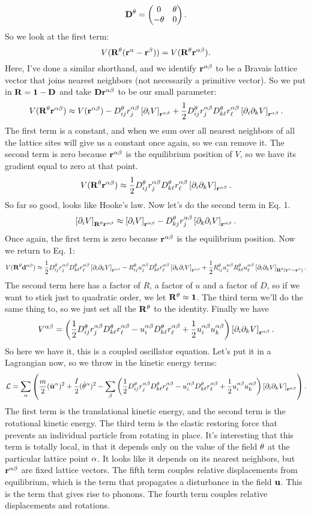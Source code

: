 \documentclass[12pt]{article}
\begin{document}
\[ \mathbf{D}^\theta = \left(\begin{matrix}0 & \theta \\ -\theta & 0\end{matrix}\right).\]
So we look at the first term:
\[ V(\mathbf{R}^\theta (\mathbf{r}^\alpha - \mathbf{r}^\beta)) = V(\mathbf{R}^\theta \mathbf{r}^{\alpha\beta}).\]
Here, I've done a similar shorthand, and we identify $\mathbf{r}^{\alpha\beta}$ to be a Bravais lattice vector that joins nearest neighbors (not necessarily a primitive vector). So we put in $\mathbf{R} = \mathbf{1} - \mathbf{D}$ and take $\mathbf{D} \mathbf{r}^{\alpha\beta}$ to be our small parameter:
\[ V(\mathbf{R}^\theta \mathbf{r}^{\alpha\beta}) \approx V(\mathbf{r}^{\alpha\beta}) - D^\theta_{ij}r^{\alpha\beta}_j \left [ \partial_i V \right ]_{\mathbf{r}^{\alpha\beta}} + \frac{1}{2} D^\theta_{ij}r^{\alpha\beta}_j D^\theta_{k\ell} r^{\alpha\beta}_\ell \left [ \partial_i\partial_k V \right ]_{\mathbf{r}^{\alpha\beta}}.\]
The first term is a constant, and when we sum over all nearest neighbors of all the lattice sites will give us a constant once again, so we can remove it. The second term is zero because $\mathbf{r}^{\alpha\beta}$ is the equilibrium position of $V$, so we have its gradient equal to zero at that point.
\[ V(\mathbf{R}^\theta \mathbf{r}^{\alpha\beta}) \approx \frac{1}{2} D^\theta_{ij}r^{\alpha\beta}_j D^\theta_{k\ell} r^{\alpha\beta}_\ell \left [ \partial_i\partial_k V \right ]_{\mathbf{r}^{\alpha\beta}}.\]
So far so good, looks like Hooke's law. Now let's do the second term in Eq. 1.
\[ \left [ \partial_i V \right ]_{\mathbf{R}^\theta \mathbf{r}^{\alpha\beta}} \approx \left [ \partial_i V \right ]_{\mathbf{r}^{\alpha\beta}} - D^\theta_{k j}r^{\alpha\beta}_j \left [ \partial_k \partial_i V \right ]_{\mathbf{r}^{\alpha\beta}}.\]
Once again, the first term is zero because $\mathbf{r}^{\alpha\beta}$ is the equilibrium position. Now we return to Eq. 1:
\[ V(\mathbf{R}^\theta \mathbf{d}^{\alpha\beta}) \approx \frac{1}{2} D^\theta_{ij}r^{\alpha\beta}_j D^\theta_{k\ell} r^{\alpha\beta}_\ell \left [ \partial_i\partial_k V \right ]_{\mathbf{r}^{\alpha\beta}} -R^\theta_{ij} u^{\alpha\beta}_j D^\theta_{k\ell}r^{\alpha\beta}_\ell \left [ \partial_k \partial_i V \right ]_{\mathbf{r}^{\alpha\beta}} + \frac{1}{2} R^\theta_{ij}u^{\alpha\beta}_jR^\theta_{k \ell}u^{\alpha\beta}_\ell \left [ \partial_i \partial_k V \right ]_{\mathbf{R}^\theta (\mathbf{r}^\alpha - \mathbf{r}^\beta)}.\]
The second term here has a factor of $R$, a factor of $u$ and a factor of $D$, so if we want to stick just to quadratic order, we let $\mathbf{R}^\theta \approx \mathbf{1}$. The third term we'll do the same thing to, so we just set all the $\mathbf{R}^\theta$ to the identity. Finally we have
\[ V^{\alpha\beta} = \left( \frac{1}{2} D^\theta_{ij}r^{\alpha\beta}_j D^\theta_{k\ell} r^{\alpha\beta}_\ell - u^{\alpha\beta}_i D^\theta_{k\ell}r^{\alpha\beta}_\ell  +\frac{1}{2}u^{\alpha\beta}_i u^{\alpha\beta}_k       \right) \left [ \partial_i\partial_k V \right ]_{\mathbf{r}^{\alpha\beta}}.\]
So here we have it, this is a coupled oscillator equation. Let's put it in a Lagrangian now, so we throw in the kinetic energy terms:
\[ \mathcal{L} = \sum_\alpha\left( \frac{m}{2}(\dot{\mathbf{u}}^\alpha)^2    + \frac{I}{2}(\dot{\theta}^\alpha)^2 - \sum_\beta  \left( \frac{1}{2} D^\theta_{ij}r^{\alpha\beta}_j D^\theta_{k\ell} r^{\alpha\beta}_\ell - u^{\alpha\beta}_i D^\theta_{k\ell}r^{\alpha\beta}_\ell  +\frac{1}{2}u^{\alpha\beta}_i u^{\alpha\beta}_k       \right) \left [ \partial_i\partial_k V \right ]_{\mathbf{r}^{\alpha\beta}}    \right).\]
The first term is the translational kinetic energy, and the second term is the rotational kinetic energy. The third term is the elastic restoring force that prevents an individual particle from rotating in place. It's interesting that this term is totally local, in that it depends only on the value of the field $\theta$ at the particular lattice point $\alpha$. It looks like it depends on its nearest neighbors, but $\mathbf{r}^{\alpha\beta}$ are fixed lattice vectors. The fifth term couples relative displacements from equilibrium, which is the term that propagates a disturbance in the field $\mathbf{u}$. This is the term that gives rise to phonons. The fourth term couples relative displacements and rotations.
\end{document}
